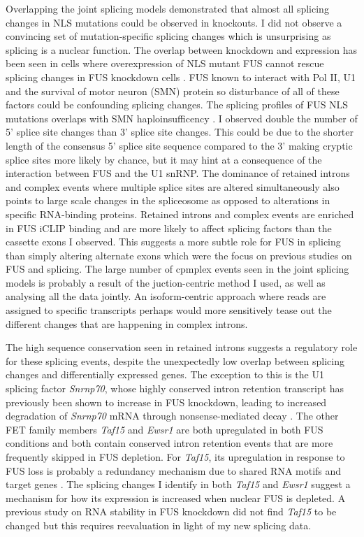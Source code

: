 Overlapping the joint splicing models demonstrated that almost all splicing changes in NLS mutations could be observed in knockouts.
I did not observe a convincing set of mutation-specific splicing changes which is unsurprising as splicing is a nuclear function. 
The overlap between knockdown and expression has been seen in cells where overexpression of NLS mutant FUS cannot rescue splicing changes in FUS knockdown cells \citep{Sun2015a}.
FUS known to interact with Pol II, U1 and the survival of motor neuron (SMN) protein \citep{Schwartz2012, Yu2015} so disturbance of all of these factors could be confounding splicing changes. 
The splicing profiles of FUS NLS mutations overlaps with SMN haploinsufficency \citep{Mirra2017}.
I observed double the number of 5' splice site changes than 3' splice site changes. This could be due to the shorter length of the consensus 5' splice site sequence compared to the 3' making cryptic splice sites more likely by chance, but it may hint at a consequence of the interaction between FUS and the U1 snRNP.
The dominance of retained introns and complex events where multiple splice sites are altered simultaneously also points to large scale changes in the spliceosome as opposed to alterations in specific RNA-binding proteins.
Retained introns and complex events are enriched in FUS iCLIP binding and are more likely to affect splicing factors than the cassette exons I observed. 
This suggests a more subtle role for FUS in splicing than simply altering alternate exons which were the focus on previous studies on FUS and splicing.
The large number of cpmplex events seen in the joint splicing models is probably a result of the juction-centric method I used, as well as analysing all the data jointly. 
An isoform-centric approach where reads are assigned to specific transcripts \citep{Trapnell2010,Bray2015} perhaps would more sensitively tease out the different changes that are happening in complex introns.

The high sequence conservation seen in retained introns suggests a regulatory role for these splicing events, despite the unexpectedly low overlap between splicing changes and differentially expressed genes.
The exception to this is the U1 splicing factor \textit{Snrnp70}, whose highly conserved intron retention transcript has previously been shown to increase in FUS knockdown, leading to increased degradation of \textit{Snrnp70} mRNA through nonsense-mediated decay \citep{Nakaya2013}.
The other FET family members \textit{Taf15} and \textit{Ewsr1} are both upregulated in both FUS conditions and both contain conserved intron retention events that are more frequently skipped in FUS depletion.
For \textit{Taf15}, its upregulation in response to FUS loss is probably a redundancy mechanism due to shared RNA motifs and target genes \citep{Kapeli2016,Ibrahim2013}. 
The splicing changes I identify in both \textit{Taf15} and \textit{Ewsr1} suggest a mechanism for how its expression is increased when nuclear FUS is depleted.
A previous study on RNA stability in FUS knockdown did not find \textit{Taf15} to be changed  \citep{Colombrita2012} but this requires reevaluation in light of my new splicing data.

